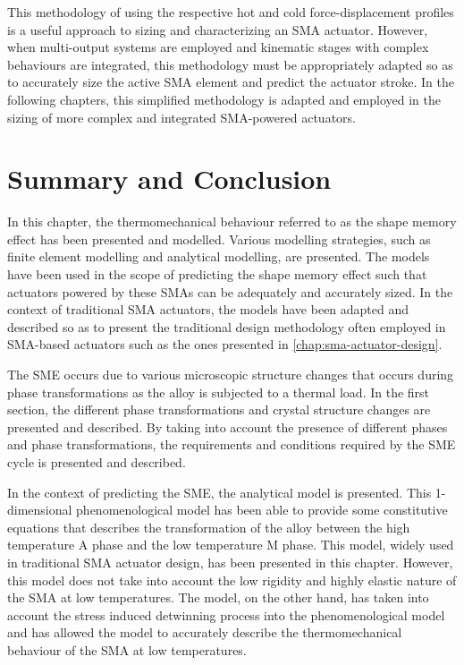 This methodology of using the respective hot and cold force-displacement profiles is a useful approach to sizing and characterizing an SMA actuator. However, when multi-output systems are employed and kinematic stages with complex behaviours are integrated, this methodology must be appropriately adapted so as to accurately size the active SMA element and predict the actuator stroke. In the following chapters, this simplified methodology is adapted and employed in the sizing of more complex and integrated SMA-powered actuators.

\section{Summary and Conclusion}
In this chapter, the thermomechanical behaviour referred to as the shape memory effect has been presented and modelled. Various modelling strategies, such as finite element modelling and analytical modelling, are presented. The models have been used in the scope of predicting the shape memory effect such that actuators powered by these SMAs can be adequately and accurately sized. In the context of traditional SMA actuators, the models have been adapted and described so as to present the traditional design methodology often employed in SMA-based actuators such as the ones presented in \cref{chap:sma-actuator-design}.

The SME occurs due to various microscopic structure changes that occurs during phase transformations as the alloy is subjected to a thermal load. In the first section, the different phase transformations and crystal structure changes are presented and described. By taking into account the presence of different phases and phase transformations, the requirements and conditions required by the SME cycle is presented and described.

In the context of predicting the SME, the \cite{liangConstitutiveModelingShape1990a} analytical model is presented. This 1-dimensional phenomenological model has been able to provide some constitutive equations that describes the transformation of the alloy between the high temperature A phase and the low temperature M phase. This model, widely used in traditional SMA actuator design, has been presented in this chapter. However, this model does not take into account the low rigidity and highly elastic nature of the SMA at low temperatures. The \cite{brinsonOneDimensionalConstitutiveBehavior1993} model, on the other hand, has taken into account the stress induced detwinning process into the phenomenological model and has allowed the model to accurately describe the thermomechanical behaviour of the SMA at low temperatures.

